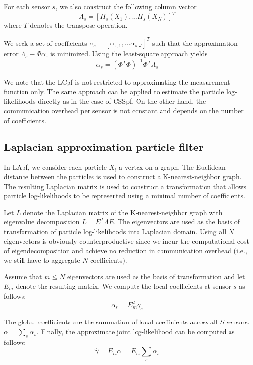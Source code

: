 \documentclass[10pt,letterpaper,final]{article}
\begin{document}
For each sensor $s$, we also construct the following column vector
\begin{equation}
\Lambda_s = [ H_s(X_1), ... H_s(X_N)  ]^T
\label{eqn:lambda_vector}
\end{equation}
where $T$ denotes the transpose operation. 

We seek a set of coefficients $\alpha_s = [\alpha_{s,1},...\alpha_{s,J}]^T$ such that the approximation error $\Lambda_s - \Phi \alpha_s$ is minimized. Using the least-square approach yields
\begin{equation}
\alpha_s = (\Phi^T\Phi)^{-1}\Phi^T\Lambda_s
\end{equation}

We note that the LCpf is not restricted to approximating the measurement function only. The same approach can be applied to estimate the particle log-likelihoods directly as in the case of CSSpf. On the other hand, the communication overhead per sensor is not constant and depends on the number of coefficients.

\subsection{Laplacian approximation particle filter}
In LApf, we consider each particle $X_i$ a vertex on a graph. The Euclidean distance between the particles is used to construct a K-nearest-neighbor graph. The resulting Laplacian matrix is used to construct a transformation that allows particle log-likelihoods to be represented using a minimal number of coefficients. 

Let $L$ denote the Laplacian matrix of the K-nearest-neighbor graph with eigenvalue decomposition $L=E^T\Lambda E$. The eigenvectors are used as the basis of transformation of particle log-likelihoods into Laplacian domain. Using all $N$ eigenvectors is obviously counterproductive since we incur the computational cost of eigendecomposition and achieve no reduction in communication overhead (i.e., we still have to aggregate $N$ coefficients). 

Assume that $m\leq N$ eigenvectors are used as the basis of transformation and let $E_m$ denote the resulting matrix. We compute the local coefficients at sensor $s$ as follows:
\begin{equation}
\alpha_s = E_m^T\gamma_s
\end{equation}

The global coefficients are the summation of local coefficients across all $S$ sensors: $\alpha = \sum_s \alpha_s$. Finally, the approximate joint log-likelihood can be computed as follows:
\begin{equation}
\hat{\gamma} = E_m\alpha = E_m \sum_s \alpha_s
\end{equation}
\end{document}
